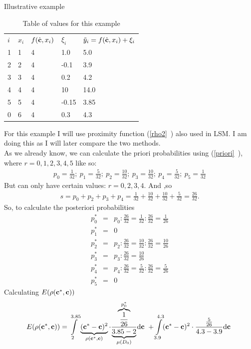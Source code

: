 \begin{subsection}{Illustrative example}
\begin{table}[h!]
\caption {Table of values for this example} \label{tab:title} 
\centering
\begin{tabular}{lllll}
$i$ & $x_{i}$ & $f(\dot{\textbf{c}},x_{i})$ & $\xi_{i}$  & $\tilde{y}_{i}=f(\dot{\textbf{c}},x_{i})+\xi_{i}$  \\
1 & 1 & 4      & 1.0   & 5.0   \\
2 & 2 & 4      & -0.1  & 3.9   \\
3 & 3 & 4      & 0.2   & 4.2   \\
4 & 4 & 4      & 10    & 14.0  \\
5 & 5 & 4      & -0.15 & 3.85  \\
0 & 6 & 4      & 0.3   & 4.3  
\end{tabular}
\end{table}
\noindent
For this example I will use proximity function (\vref{rho2}~) also used in LSM. I am doing this as I will later compare the two methods.\\
\noindent
As we already know, we can calculate the priori probabilities using (\vref{priori}~), where $r=0,1,2,3,4,5$ like so:
\begin{gather*}
p_{0}= \frac{1}{32}; \ p_{1}= \frac{5}{32}; \ p_{2}= \frac{10}{32}; \ p_{3}= \frac{10}{32}; \ p_{4}= \frac{5}{32}; \ p_{5}= \frac{1}{32}
\end{gather*}
But can only have certain values: $r=0,2,3,4$. And ,so 
\begin{gather*}
s=p_{0}+p_{2}+p_{3}+p_{4}= \frac{1}{32} + \frac{10}{32} + \frac{10}{32} + \frac{5}{32} = \frac{26}{32}.
\end{gather*}
So, to calculate the posteriori probabilities
\begin{eqnarray*}
p_{0}^{*} &=& p_{0}: \frac{26}{32} = \frac{1}{32} : \frac{26}{32} = \frac{1}{26} \\
p_{1}^{*} &=& 0 \\
p_{2}^{*} &=& p_{2}: \frac{26}{32} = \frac{10}{32} : \frac{26}{32} = \frac{10}{26} \\
p_{3}^{*} &=& p_{3}: \frac{26}{32} = \frac{10}{26} \\
p_{4}^{*} &=& p_{4}: \frac{26}{32} = \frac{5}{32} : \frac{26}{32} = \frac{5}{26} \\
p_{5}^{*} &=& 0
\end{eqnarray*}
Calculating $E(\rho(\textbf{c}^{*},\textbf{c}))$
\begin{gather*}
E(\rho(\vecc^{*},\vecc)) = \int\limits_{2}^{3.85} \underbrace{(\vecc^{*}-\vecc)^{2}}_{\rho(\vecc^{*},\vecc)} \cdot \frac{\overbrace{\frac{1}{26}}^{p_{0}^{*}}}{\underbrace{3.85-2}_{\mu(D_{0})}} \mathrm{d}\vecc \ + \int\limits_{3.9}^{4.3} (\vecc^{*}-\vecc)^{2} \cdot \frac{\frac{5}{26}}{4.3-3.9} \mathrm{d}\vecc \

\end{gather*}
\end{subsection}
